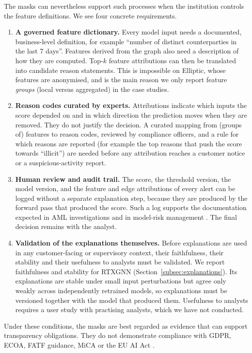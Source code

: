 The masks can nevertheless support such processes when the institution controls the feature definitions. We see four concrete requirements.
\begin{enumerate}
\item \textbf{A governed feature dictionary.} Every model input needs a documented, business-level definition, for example ``number of distinct counterparties in the last 7 days''. Features derived from the graph also need a description of how they are computed. Top-$k$ feature attributions can then be translated into candidate reason statements. This is impossible on Elliptic, whose features are anonymised, and is the main reason we only report feature \emph{groups} (local versus aggregated) in the case studies.
\item \textbf{Reason codes curated by experts.} Attributions indicate which inputs the score depended on and in which direction the prediction moves when they are removed. They do not justify the decision. A curated mapping from (groups of) features to reason codes, reviewed by compliance officers, and a rule for which reasons are reported (for example the top reasons that push the score towards ``illicit'') are needed before any attribution reaches a customer notice or a suspicious-activity report.
\item \textbf{Human review and audit trail.} The score, the threshold version, the model version, and the feature and edge attributions of every alert can be logged without a separate explanation step, because they are produced by the forward pass that produced the score. Such a log supports the documentation expected in AML investigations and in model-risk management \citep{sr117}. The final decision remains with the analyst.
\item \textbf{Validation of the explanations themselves.} Before explanations are used in any customer-facing or supervisory context, their faithfulness, their stability and their usefulness to analysts must be validated. We report faithfulness and stability for RTXGNN (Section~\ref{subsec:explanations}). Its explanations are stable under small input perturbations but agree only weakly across independently retrained models, so explanations must be versioned together with the model that produced them. Usefulness to analysts requires a user study with practising analysts, which we have not conducted.
\end{enumerate}
Under these conditions, the masks are best regarded as evidence that can support transparency obligations. They do not demonstrate compliance with GDPR, ECOA, FATF guidance, MiCA or the EU AI Act \citep{euaiact2024}.

